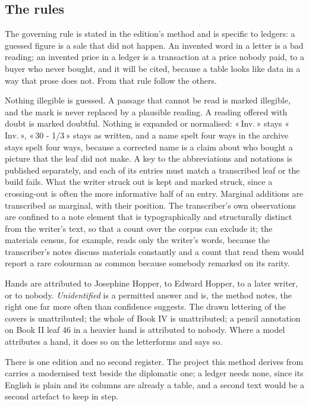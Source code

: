 \documentclass[11pt]{article}
\newcommand{\q}[1]{«\,#1\,»}
\begin{document}
\subsection{The rules}

The governing rule is stated in the edition's method and is specific to ledgers: a guessed figure is a sale that did not happen. An invented word in a letter is a bad reading; an invented price in a ledger is a transaction at a price nobody paid, to a buyer who never bought, and it will be cited, because a table looks like data in a way that prose does not. From that rule follow the others.

Nothing illegible is guessed. A passage that cannot be read is marked illegible, and the mark is never replaced by a plausible reading. A reading offered with doubt is marked doubtful. Nothing is expanded or normalised: \q{Inv.} stays \q{Inv.}, \q{30 - 1/3} stays as written, and a name spelt four ways in the archive stays spelt four ways, because a corrected name is a claim about who bought a picture that the leaf did not make. A key to the abbreviations and notations is published separately, and each of its entries must match a transcribed leaf or the build fails. What the writer struck out is kept and marked struck, since a crossing-out is often the more informative half of an entry. Marginal additions are transcribed as marginal, with their position. The transcriber's own observations are confined to a note element that is typographically and structurally distinct from the writer's text, so that a count over the corpus can exclude it; the materials census, for example, reads only the writer's words, because the transcriber's notes discuss materials constantly and a count that read them would report a rare colourman as common because somebody remarked on its rarity.

Hands are attributed to Josephine Hopper, to Edward Hopper, to a later writer, or to nobody. \emph{Unidentified} is a permitted answer and is, the method notes, the right one far more often than confidence suggests. The drawn lettering of the covers is unattributed; the whole of Book IV is unattributed; a pencil annotation on Book II leaf 46 in a heavier hand is attributed to nobody. Where a model attributes a hand, it does so on the letterforms and says so.

There is one edition and no second register. The project this method derives from carries a modernised text beside the diplomatic one; a ledger needs none, since its English is plain and its columns are already a table, and a second text would be a second artefact to keep in step.
\end{document}
